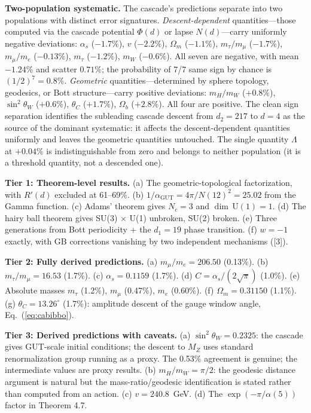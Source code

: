 \documentclass[12pt,a4paper]{article}
\begin{document}
\textbf{Two-population systematic.} The cascade's predictions separate into two populations with distinct error signatures. \textit{Descent-dependent} quantities---those computed via the cascade potential $\Phi(d)$ or lapse $N(d)$---carry uniformly negative deviations: $\alpha_s$ ($-1.7\%$), $v$ ($-2.2\%$), $\Omega_m$ ($-1.1\%$), $m_\tau/m_\mu$ ($-1.7\%$), $m_\mu/m_e$ ($-0.13\%$), $m_\tau$ ($-1.2\%$), $m_W$ ($-0.6\%$). All seven are negative, with mean $-1.24\%$ and scatter $0.71\%$; the probability of 7/7 same sign by chance is $(1/2)^7 = 0.8\%$. \textit{Geometric} quantities---determined by sphere topology, geodesics, or Bott structure---carry positive deviations: $m_H/m_W$ ($+0.8\%$), $\sin^2\theta_W$ ($+0.6\%$), $\theta_C$ ($+1.7\%$), $\Omega_b$ ($+2.8\%$). All four are positive. The clean sign separation identifies the subleading cascade descent from $d_2 = 217$ to $d = 4$ as the source of the dominant systematic: it affects the descent-dependent quantities uniformly and leaves the geometric quantities untouched. The single quantity $\Lambda$ at $+0.04\%$ is indistinguishable from zero and belongs to neither population (it is a threshold quantity, not a descended one).

\textbf{Tier 1: Theorem-level results.} (a) The geometric-topological factorization, with $R'(d)$ excluded at 61--69\%. (b) $1/\alpha_{\text{GUT}} = 4\pi/N(12)^2 = 25.02$ from the Gamma function. (c) Adams' theorem gives $N_c = 3$ and $\dim\,\text{U}(1) = 1$. (d) The hairy ball theorem gives SU(3) $\times$ U(1) unbroken, SU(2) broken. (e) Three generations from Bott periodicity + the $d_1 = 19$ phase transition. (f) $w = -1$ exactly, with GB corrections vanishing by two independent mechanisms ([3]).

\textbf{Tier 2: Fully derived predictions.} (a) $m_\mu/m_e = 206.50$ (0.13\%). (b) $m_\tau/m_\mu = 16.53$ (1.7\%). (c) $\alpha_s = 0.1159$ (1.7\%). (d) $C = \alpha_s/(2\sqrt{\pi})$ (1.0\%). (e) Absolute masses $m_\tau$ (1.2\%), $m_\mu$ (0.47\%), $m_e$ (0.60\%). (f) $\Omega_m = 0.31150$ (1.1\%). (g) $\theta_C = 13.26^\circ$ (1.7\%): amplitude descent of the gauge window angle, Eq.~(\ref{eq:cabibbo}).

\textbf{Tier 3: Derived predictions with caveats.} (a) $\sin^2\theta_W = 0.2325$: the cascade gives GUT-scale initial conditions; the descent to $M_Z$ uses standard renormalization group running as a proxy. The 0.53\% agreement is genuine; the intermediate values are proxy results. (b) $m_H/m_W = \pi/2$: the geodesic distance argument is natural but the mass-ratio/geodesic identification is stated rather than computed from an action. (c) $v = 240.8$~GeV. (d) The $\exp(-\pi/\alpha(5))$ factor in Theorem 4.7.
\end{document}
